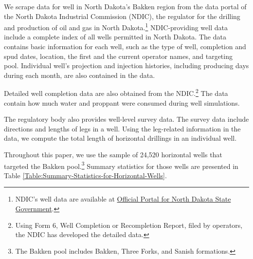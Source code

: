 We scrape data for well in North Dakota's Bakken region from the data portal of the North Dakota Industrial Commission (NDIC), the regulator for the drilling and production of oil and gas in North Dakota.\footnote{NDIC's well data are available at \href{https://www.dmr.nd.gov/oilgas}{Official Portal for North Dakota State Government}.} NDIC-providing well data include a complete index of all wells permitted in North Dakota. The data contains basic information for each well, such as the type of well, completion and spud dates, location, the first and the current operator names, and targeting pool. Individual well's projection and injection histories, including producing days during each month, are also contained in the data. 

Detailed well completion data are also obtained from the NDIC.\footnote{Using Form 6, Well Completion or Recompletion Report, filed by operators, the NDIC has developed the detailed data.} The data contain how much water and proppant were consumed during well simulations.

The regulatory body also provides well-level survey data. The survey data include directions and lengths of legs in a well. Using the leg-related information in the data, we compute the total length of horizontal drillings in an individual well. 

Throughout this paper, we use the sample of 24,520 horizontal wells that targeted the Bakken pool.\footnote{The Bakken pool includes Bakken, Three Forks, and Sanish formations.} Summary statistics for those wells are presented in Table \ref{Table:Summary-Statistics-for-Horizontal-Wells}.
